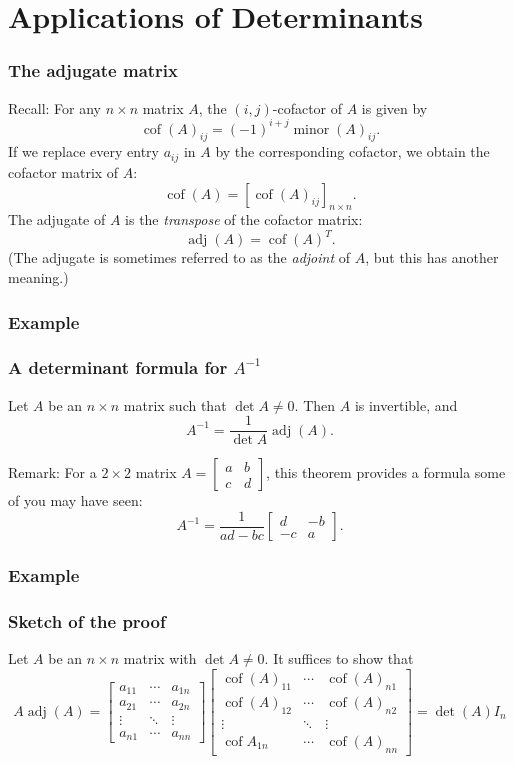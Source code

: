 \documentclass[11pt,t]{beamer}
\DeclareMathOperator{\cof}{cof}
\DeclareMathOperator{\adj}{adj}
\begin{document}
\section{Applications of Determinants}
\begin{frame}
\frametitle{The adjugate matrix}
\alert{Recall}: For any $n\times n$ matrix $A$, the $(i,j)$-cofactor of $A$ is given by
\[
\cof(A)_{ij} = (-1)^{i+j}\operatorname{minor}(A)_{ij}.
\]
If we replace every entry $a_{ij}$ in $A$ by the corresponding cofactor, we obtain the \alert{cofactor matrix} of $A$:
\[
\cof(A) = [\cof(A)_{ij}]_{n\times n}.
\]
The \alert{adjugate} of $A$ is the {\em transpose} of the cofactor matrix:
\[
\adj(A) = \cof(A)^T.
\]
(The adjugate is sometimes referred to as the {\em adjoint} of $A$, but this has another meaning.)
\end{frame}
\begin{frame}
\frametitle{Example}

\end{frame}
\begin{frame}
\frametitle{A determinant formula for $A^{-1}$}
\begin{theorem}
Let $A$ be an $n\times n$ matrix such that $\det A\neq 0$. Then $A$ is invertible, and
\[
A^{-1} = \frac{1}{\det A}\adj(A).
\]
\end{theorem}
\alert{Remark}: For a $2\times 2$ matrix $A=\begin{bmatrix}a&b\\c&d\end{bmatrix}$, this theorem provides a formula some of you may have seen:
\[
A^{-1} = \frac{1}{ad-bc}\begin{bmatrix}d&-b\\-c&a\end{bmatrix}.
\]

\end{frame}
\begin{frame}
\frametitle{Example}

\end{frame}
\begin{frame}
\frametitle{Sketch of the proof}
Let $A$ be an $n\times n$ matrix with $\det A\neq 0$. It suffices to show that
\[
A\adj(A) = \begin{bmatrix}
a_{11}&\cdots & a_{1n}\\
a_{21}&\cdots & a_{2n}\\
\vdots &\ddots &\vdots\\
a_{n1}&\cdots &a_{nn}
\end{bmatrix}
\begin{bmatrix}
\cof(A)_{11}&\cdots &\cof(A)_{n1}\\
\cof(A)_{12}&\cdots &\cof(A)_{n2}\\
\vdots &\ddots &\vdots\\
\cof{A}_{1n}&\cdots & \cof(A)_{nn}
\end{bmatrix} = \det(A)I_n
\]
\end{frame}
\end{document}
